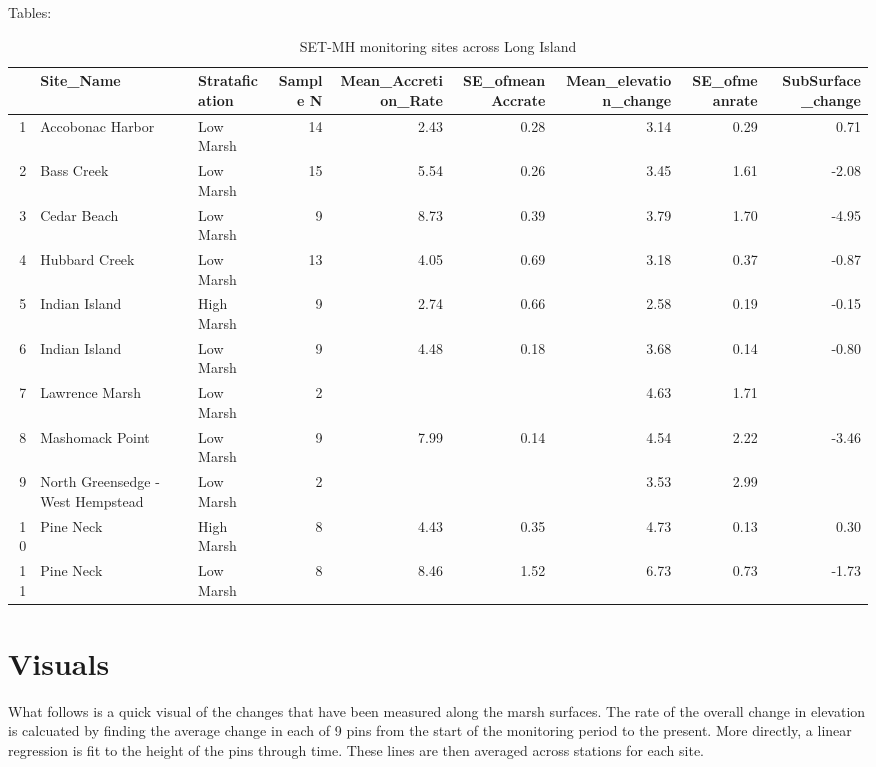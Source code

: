 \documentclass{article}\usepackage[]{graphicx}\usepackage[]{color}
\begin{document}
Tables:
\begin{table}[ht]
\centering
\begin{tabular}{rllrrrrrr}
  \hline
 & Site\_Name & Stratafication & Sample N & Mean\_Accretion\_Rate & SE\_ofmeanAccrate & Mean\_elevation\_change & SE\_ofmeanrate & SubSurface\_change \\ 
  \hline
1 & Accobonac Harbor & Low Marsh &  14 & 2.43 & 0.28 & 3.14 & 0.29 & 0.71 \\ 
  2 & Bass Creek & Low Marsh &  15 & 5.54 & 0.26 & 3.45 & 1.61 & -2.08 \\ 
  3 & Cedar Beach & Low Marsh &   9 & 8.73 & 0.39 & 3.79 & 1.70 & -4.95 \\ 
  4 & Hubbard Creek & Low Marsh &  13 & 4.05 & 0.69 & 3.18 & 0.37 & -0.87 \\ 
  5 & Indian Island & High Marsh &   9 & 2.74 & 0.66 & 2.58 & 0.19 & -0.15 \\ 
  6 & Indian Island & Low Marsh &   9 & 4.48 & 0.18 & 3.68 & 0.14 & -0.80 \\ 
  7 & Lawrence Marsh & Low Marsh &   2 &  &  & 4.63 & 1.71 &  \\ 
  8 & Mashomack Point & Low Marsh &   9 & 7.99 & 0.14 & 4.54 & 2.22 & -3.46 \\ 
  9 & North Greensedge - West Hempstead & Low Marsh &   2 &  &  & 3.53 & 2.99 &  \\ 
  10 & Pine Neck & High Marsh &   8 & 4.43 & 0.35 & 4.73 & 0.13 & 0.30 \\ 
  11 & Pine Neck & Low Marsh &   8 & 8.46 & 1.52 & 6.73 & 0.73 & -1.73 \\ 
   \hline
\end{tabular}
\caption{SET-MH monitoring sites across Long Island} 
\end{table}




\section{Visuals}
What follows is a quick visual of the changes that have been measured along the marsh surfaces. The rate of the overall change in elevation is calcuated by finding the average change in each of 9 pins from the start of the monitoring period to the present. More directly, a linear regression is fit to the height of the pins through time. These lines are then averaged across stations for each site. 
\end{document}
